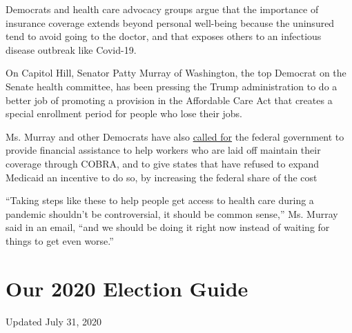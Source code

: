 Democrats and health care advocacy groups argue that the importance of
insurance coverage extends beyond personal well-being because the
uninsured tend to avoid going to the doctor, and that exposes others to
an infectious disease outbreak like Covid-19.

On Capitol Hill, Senator Patty Murray of Washington, the top Democrat on
the Senate health committee, has been pressing the Trump administration
to do a better job of promoting a provision in the Affordable Care Act
that creates a special enrollment period for people who lose their jobs.

Ms. Murray and other Democrats have also
\href{https://www.help.senate.gov/ranking/newsroom/press/bicameral-democratic-health-leaders-call-for-additional-action-to-ensure-cost-is-not-a-barrier-for-covid-19-treatment}{called
for} the federal government to provide financial assistance to help
workers who are laid off maintain their coverage through COBRA, and to
give states that have refused to expand Medicaid an incentive to do so,
by increasing the federal share of the cost

``Taking steps like these to help people get access to health care
during a pandemic shouldn't be controversial, it should be common
sense,'' Ms. Murray said in an email, ``and we should be doing it right
now instead of waiting for things to get even worse.''

\hypertarget{our-2020-election-guide}{%
\section{Our 2020 Election Guide}\label{our-2020-election-guide}}

Updated July 31, 2020

